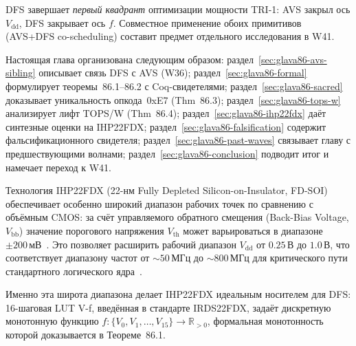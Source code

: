 
DFS завершает \emph{первый квадрант} оптимизации мощности TRI-1:
AVS закрыл ось $V_{\mathrm{dd}}$, DFS закрывает ось $f$.
Совместное применение обоих примитивов (AVS+DFS co-scheduling) составит
предмет отдельного исследования в W41.

Настоящая глава организована следующим образом:
раздел~\ref{sec:glava86-avs-sibling} описывает связь DFS с AVS (W36);
раздел~\ref{sec:glava86-formal} формулирует теоремы~86.1--86.2 с Coq-свидетелями;
раздел~\ref{sec:glava86-sacred} доказывает уникальность опкода~0xE7 (Thm~86.3);
раздел~\ref{sec:glava86-tops-w} анализирует лифт TOPS/W (Thm~86.4);
раздел~\ref{sec:glava86-ihp22fdx} даёт синтезные оценки на IHP22FDX;
раздел~\ref{sec:glava86-falsification} содержит фальсификационного свидетеля;
раздел~\ref{sec:glava86-past-waves} связывает главу с предшествующими волнами;
раздел~\ref{sec:glava86-conclusion} подводит итог и намечает переход к W41.


Технология IHP22FDX (22-нм Fully Depleted Silicon-on-Insulator, FD-SOI)
обеспечивает особенно широкий диапазон рабочих точек по сравнению с
объёмным CMOS: за счёт управляемого обратного смещения (Back-Bias Voltage,
$V_{\mathrm{bb}}$) значение порогового напряжения $V_{\mathrm{th}}$ может
варьироваться в диапазоне $\pm 200\,\text{мВ}$~\cite{IRDS2023-MoreMoore}.
Это позволяет расширить рабочий диапазон $V_{\mathrm{dd}}$ от
$0{.}25\,\text{В}$ до $1{.}0\,\text{В}$, что соответствует диапазону частот
от $\sim\!50\,\text{МГц}$ до $\sim\!800\,\text{МГц}$ для критического пути
стандартного логического ядра~\cite{IRDS2023-MoreMoore}.

Именно эта широта диапазона делает IHP22FDX идеальным носителем для DFS:
16-шаговая LUT V-f, введённая в стандарте IRDS22FDX, задаёт дискретную
монотонную функцию $f: \{V_0, V_1, \ldots, V_{15}\} \to \mathbb{R}_{>0}$,
формальная монотонность которой доказывается в Теореме~86.1.


